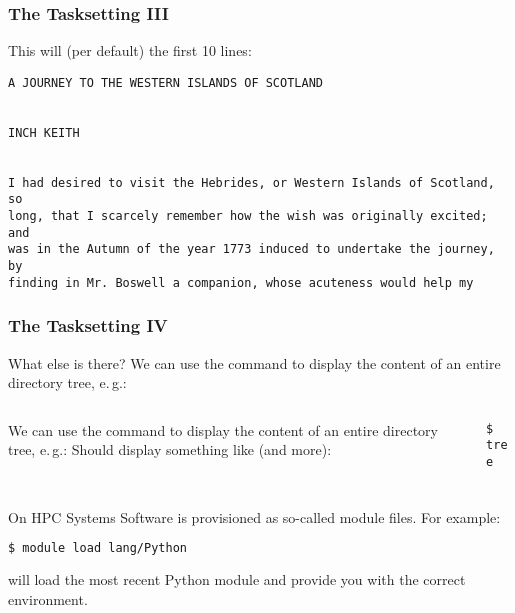 \begin{frame}[fragile]
  \frametitle{The Tasksetting III}
  This will (per default) the first 10 lines:
  \begin{lstlisting}[style=Plain, basicstyle=\ttfamily\tiny]
A JOURNEY TO THE WESTERN ISLANDS OF SCOTLAND


INCH KEITH


I had desired to visit the Hebrides, or Western Islands of Scotland, so
long, that I scarcely remember how the wish was originally excited; and
was in the Autumn of the year 1773 induced to undertake the journey, by
finding in Mr. Boswell a companion, whose acuteness would help my
  \end{lstlisting}
  \pause
\end{frame}

\begin{frame}[fragile]
  \frametitle{The Tasksetting IV}
  What else is there?\newline
  We can use the  command to display the content of an entire directory tree, e.\,g.:
  \begin{columns}
    \begin{column}{0.2\textwidth}
    \footnotesize
    We can use the  command to display the content of an entire directory tree, e.\,g.:\newline
     Should display something like (and more):
    \end{column}
    \begin{column}{0.8\textwidth}
    \begin{minipage}[t]{0.5\textwidth}
            {\tiny \DTsetlength{0.2em}{1em}{0.2em}{0.4pt}{.6pt}
\texttt{\$ tree}
}
    \end{minipage}


    \end{column}
  \end{columns}
\end{frame}

\begin{frame}[fragile]
  \frametitle{}
  On HPC Systems Software is provisioned as so-called module files. For example:
  \begin{lstlisting}[language=Bash, style=Shell]
$ module load lang/Python
  \end{lstlisting}
  will load the most recent Python module and provide you with the correct environment.
\end{frame}

